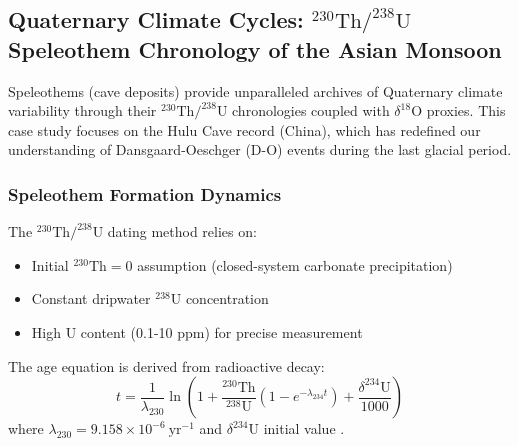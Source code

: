 \documentclass{article}
\begin{document}
\subsection{Quaternary Climate Cycles: \(^{230}\text{Th}/^{238}\text{U}\) Speleothem Chronology of the Asian Monsoon}
\label{subsec:monsoon_case}

Speleothems (cave deposits) provide unparalleled archives of Quaternary climate variability through their \(^{230}\text{Th}/^{238}\text{U}\) chronologies coupled with \(\delta^{18}\text{O}\) proxies. This case study focuses on the Hulu Cave record (China), which has redefined our understanding of Dansgaard-Oeschger (D-O) events during the last glacial period.

\subsubsection*{Speleothem Formation Dynamics}
The \(^{230}\text{Th}/^{238}\text{U}\) dating method relies on:
\begin{itemize}
    \item Initial \(^{230}\text{Th} = 0\) assumption (closed-system carbonate precipitation)
    \item Constant dripwater \(^{238}\text{U}\) concentration
    \item High U content (0.1-10 ppm) for precise measurement
\end{itemize}

The age equation is derived from radioactive decay:
\begin{equation}
    t = \frac{1}{\lambda_{230}} \ln\left(1 + \frac{{}^{230}\text{Th}}{{}^{238}\text{U}} \left(1 - e^{-\lambda_{234}t}\right) + \frac{\delta^{234}\text{U}}{1000}\right)
    \label{eq:thu_age}
\end{equation}
where \(\lambda_{230} = 9.158 \times 10^{-6}\ \text{yr}^{-1}\) and \(\delta^{234}\text{U}\) initial value \cite{Cheng2013}.
\end{document}
